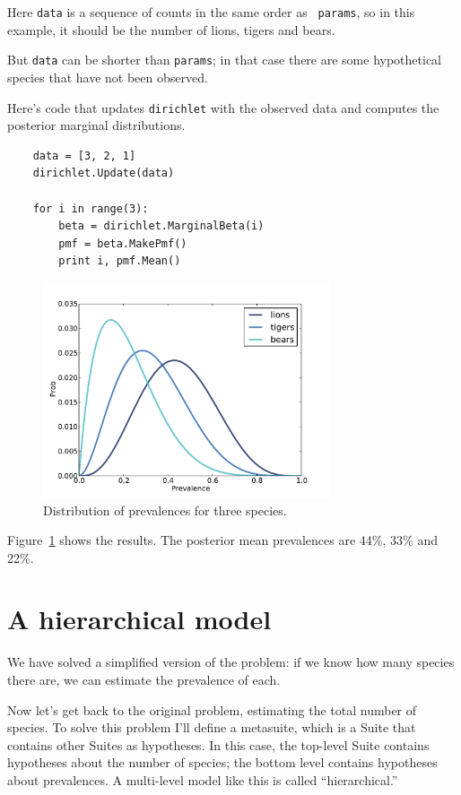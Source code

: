 \documentclass[12pt]{book}
\begin{document}
Here {\tt data} is a sequence of counts in the same order as {\tt
  params}, so in this example, it should be the number of lions,
tigers and bears.

But {\tt data} can be shorter than {\tt params}; in that
case there are some hypothetical species that have not been
observed.

Here's code that updates {\tt dirichlet} with the observed data and
computes the posterior marginal distributions.

\begin{verbatim}
    data = [3, 2, 1]
    dirichlet.Update(data)

    for i in range(3):
        beta = dirichlet.MarginalBeta(i)
        pmf = beta.MakePmf()
        print i, pmf.Mean()
\end{verbatim}

\begin{figure}
\centerline{\includegraphics[height=2.5in]{figs/species1.pdf}}
\caption{Distribution of prevalences for three species.}
\label{fig.species1}
\end{figure}

Figure~\ref{fig.species1} shows the results.  The posterior
mean prevalences are 44\%, 33\% and 22\%.


\section{A hierarchical model}

We have solved a simplified version of the problem: if we
know how many species there are, we can estimate the prevalence
of each.

Now let's get back to the original problem, estimating the total
number of species.  To solve this problem I'll define a metasuite,
which is a Suite that contains other Suites as hypotheses.  In this
case, the top-level Suite contains hypotheses about the number of
species; the bottom level contains hypotheses about prevalences.
A multi-level model like this is called ``hierarchical.''
\end{document}
